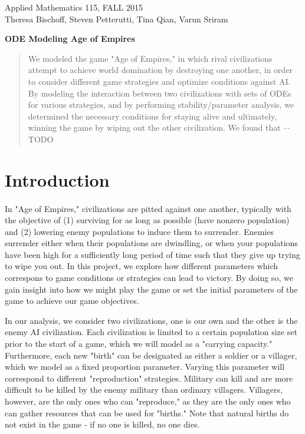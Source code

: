 \documentclass[12pt]{article}
\begin{document}
\begin{center}
Applied Mathematics 115, FALL 2015 \\


Theresa Bischoff, Steven Petterutti, Tina Qian, Varun Sriram

\medskip

\textbf{ODE Modeling Age of Empires}


\end{center}

\begin{abstract}
	We modeled the game "Age of Empires," in which rival civilizations attempt to achieve world domination by destroying one another, in order to consider different game strategies and optimize conditions against AI. By modeling the interaction between two civilizations with sets of ODEs for various strategies, and by performing stability/parameter analysis, we determined the necessary conditions for staying alive and ultimately, winning the game by wiping out the other civilization. We found that $\cdots$ TODO
	
\end{abstract}

\section{Introduction}
\paragraph{}
In "Age of Empires," civilizations are pitted against one another, typically with the objective of (1) surviving for as long as possible (have nonzero population) and (2) lowering enemy populations to induce them to surrender. Enemies surrender either when their populations are dwindling, or when your populations have been high for a sufficiently long period of time such that they give up trying to wipe you out. In this project, we explore how different parameters which correspons to game conditions or strategies can lead to victory. By doing so, we gain insight into how we might play the game or set the initial parameters of the game to achieve our game objectives. \par

In our analysis, we consider two civilizations, one is our own and the other is the enemy AI civilization. Each civilization is limited to a certain population size set prior to the start of a game, which we will model as a "carrying capacity." Furthermore, each new "birth" can be designated as either a soldier or a villager, which we model as a fixed proportion parameter. Varying this parameter will correspond to different "reproduction" strategies. Military can kill and are more difficult to be killed by the enemy military than ordinary villagers. Villagers, however, are the only ones who can "reproduce," as they are the only ones who can gather resources that can be used for "births." Note that natural births do not exist in the game - if no one is killed, no one dies. \par
\end{document}
